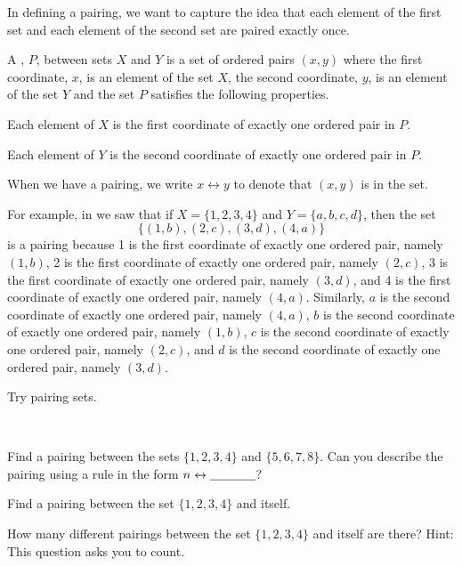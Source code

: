 In defining a pairing, we want to capture the idea that each element of the first set and each element of the second set are paired exactly once.
    
\begin{defn}[Pairing]
\label{defn_pairing}
    A , $P$, between sets $X$ and $Y$ is a set of ordered pairs $(x,y)$ where the first coordinate, $x$, is an element of the set $X$, the second coordinate, $y$, is an element of the set $Y$ and the set $P$ satisfies the following properties. 
        \begin{apart}
            \item \label{part_pairing_first_coord} Each element of $X$ is the first coordinate of exactly one ordered pair in $P$.
            \item \label{part_pairing_second_coord} Each element of $Y$ is the second coordinate of exactly one ordered pair in $P$.
        \end{apart}  
    When we have a pairing, we write $x \leftrightarrow y$ to denote that $(x,y)$ is in the set. 

    For example, in  we saw that if $X=\{1,2,3,4\}$ and $Y=\{a,b,c,d\}$, then the set $$\{(1,b),(2,c),(3,d),(4,a)\}$$ is a pairing because 1 is the first coordinate of exactly one ordered pair, namely $(1,b)$, 2 is the first coordinate of exactly one ordered pair, namely $(2,c)$, 3 is the first coordinate of exactly one ordered pair, namely $(3,d)$, and 4 is the first coordinate of exactly one ordered pair, namely $(4,a)$.  Similarly, $a$ is the second coordinate of exactly one ordered pair, namely $(4,a)$, $b$ is the second coordinate of exactly one ordered pair, namely $(1,b)$, $c$ is the second coordinate of exactly one ordered pair, namely $(2,c)$, and $d$ is the second coordinate of exactly one ordered pair, namely $(3,d)$.                
     
\end{defn}

    Try pairing sets.
    
\begin{act}
\label{act_pairing}
~        
    \begin{actpart}
        \item \label{part_pair1234_with5678} Find a pairing between the sets $\{1,2,3,4\}$ and $\{5,6,7,8\}$.  Can you describe the pairing using a rule in the form $n \leftrightarrow \underline{\hspace{.5in}}$?
        \item Find a pairing between the set $\{1,2,3,4\}$ and itself. 
        \item How many different pairings between the set $\{1,2,3,4\}$ and itself are there? Hint: This question asks you to count.   
    \end{actpart}
\end{act}

